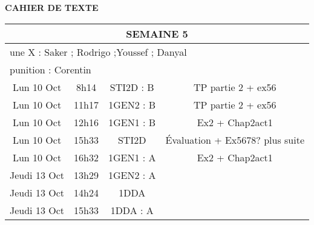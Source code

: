 \documentclass[10pt]{article}
\newcommand{\mypage}[1]{ 
		\begin{minipage}[c]{0.45\textwidth}
			\vspace{5pt}
			{#1}
			\vspace{5pt}
		\end{minipage}
}
\newcommand{\seanced}{\mypage{TP partie 2 + ex56}}
\newcommand{\seancee}{\mypage{Ex2 + Chap2act1}}
\newcommand{\seancef}{\mypage{Évaluation + Ex5678? plus suite}}
\newcommand{\seanceg}{\mypage{Ex2 + Chap2act1}}
\newcommand{\seanceh}{\mypage{}}
\newcommand{\seancei}{\mypage{}}
\newcommand{\seancej}{\mypage{}}
\begin{document}
\begin{center}
	\textbf{CAHIER DE TEXTE}
\end{center}

\setlength{\tabcolsep}{13pt}
\renewcommand{\arraystretch}{2.5}
\begin{longtable}{@{}|c|c|c|c|@{}} \toprule
	\midrule\multicolumn{4}{||c||}{SEMAINE 5}                       \\\midrule
	\multicolumn{4}{|l|}{une X : Saker ; Rodrigo ;Youssef ; Danyal} \\\midrule
	\multicolumn{4}{|l|}{punition : Corentin}                       \\\midrule
	Lun 10 Oct   & 8h14  & STI2D : B & \seanced                     \\\midrule
	Lun 10 Oct   & 11h17 & 1GEN2 : B & \seanced                     \\\midrule
	Lun 10 Oct   & 12h16 & 1GEN1 : B & \seancee                     \\\midrule
	Lun 10 Oct   & 15h33 & STI2D     & \seancef                     \\\midrule
	Lun 10 Oct   & 16h32 & 1GEN1 : A & \seanceg                     \\\midrule\midrule
	Jeudi 13 Oct & 13h29 & 1GEN2 : A & \seanceh                     \\\midrule
	Jeudi 13 Oct & 14h24 & 1DDA      & \seancei                     \\\midrule
	Jeudi 13 Oct & 15h33 & 1DDA : A  & \seancej                     \\


	\bottomrule
\end{longtable}
\end{document}

